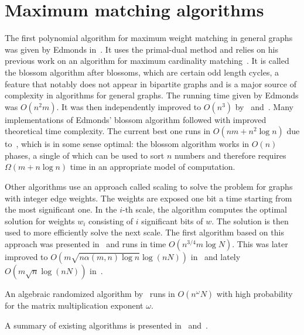 \section{Maximum matching algorithms}

The first polynomial algorithm for maximum weight matching in general graphs was given by Edmonds in~\cite{edmonds1965maximum}. It uses the primal-dual method and relies on his previous work on an algorithm for maximum cardinality matching~\cite{edmonds1965paths}. It is called the blossom algorithm after blossoms, which are certain odd length cycles, a feature that notably does not appear in bipartite graphs and is a major source of complexity in algorithms for general graphs. The running time given by Edmonds was $O(n^2m)$. It was then independently improved to $O(n^3)$ by~\cite{lawler2001combinatorial} and~\cite{gabow1974implementation}. Many implementations of Edmonds' blossom algorithm followed with improved theoretical time complexity. The current best one runs in $O(nm + n^2 \log n)$ due to~\cite{gabow1990data}, which is in some sense optimal: the blossom algorithm works in $O(n)$ phases, a single of which can be used to sort $n$ numbers and therefore requires $\Omega(m + n \log n)$ time in an appropriate model of computation. 

Other algorithms use an approach called scaling to solve the problem for graphs with integer edge weights. The weights are exposed one bit a time starting from the most significant one. In the $i$-th scale, the algorithm computes the optimal solution for weights $w_i$ consisting of $i$ significant bits of $w$. The solution is then used to more efficiently solve the next scale. The first algorithm based on this approach was presented in~\cite{gabow1984efficient} and runs in time $O(n^{3/4}m \log N)$. This was later improved to $O(m \sqrt{n\alpha(m, n) \log n} \log(nN))$ in~\cite{gabow1991faster} and lately $O(m \sqrt{n} \log(nN))$ in~\cite{duan2018scaling}. 

An algebraic randomized algorithm by~\cite{cygan2015algorithmic} runs in $O(n^\omega N)$ with high probability for the matrix multiplication exponent $\omega$.

A summary of existing algorithms is presented in~ and~.


